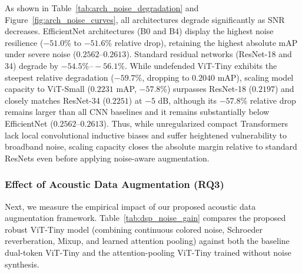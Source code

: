 \documentclass[11pt,a4paper]{article}
\begin{document}
As shown in Table~\ref{tab:arch_noise_degradation} and Figure~\ref{fig:arch_noise_curves}, all architectures degrade significantly as SNR decreases. EfficientNet architectures (B0 and B4) display the highest noise resilience ($-51.0\%$ to $-51.6\%$ relative drop), retaining the highest absolute mAP under severe noise ($0.2562\text{--}0.2613$). Standard residual networks (ResNet-18 and 34) degrade by $-54.5\%\text{--}-56.1\%$. While undefended ViT-Tiny exhibits the steepest relative degradation ($-59.7\%$, dropping to $0.2040$ mAP), scaling model capacity to ViT-Small ($0.2231$ mAP, $-57.8\%$) surpasses ResNet-18 ($0.2197$) and closely matches ResNet-34 ($0.2251$) at $-5\text{ dB}$, although its $-57.8\%$ relative drop remains larger than all CNN baselines and it remains substantially below EfficientNet ($0.2562\text{--}0.2613$). Thus, while unregularized compact Transformers lack local convolutional inductive biases and suffer heightened vulnerability to broadband noise, scaling capacity closes the absolute margin relative to standard ResNets even before applying noise-aware augmentation.

\subsubsection{Effect of Acoustic Data Augmentation (RQ3)}
Next, we measure the empirical impact of our proposed acoustic data augmentation framework. Table~\ref{tab:dsp_noise_gain} compares the proposed robust ViT-Tiny model (combining continuous colored noise, Schroeder reverberation, Mixup, and learned attention pooling) against both the baseline dual-token ViT-Tiny and the attention-pooling ViT-Tiny trained without noise synthesis.
\end{document}
